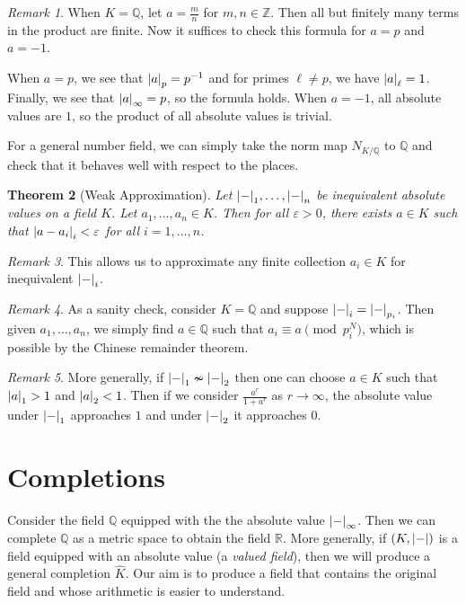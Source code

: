 \documentclass[leqno, openany]{memoir}
\newtheorem{thm}{Theorem}[section]
\theoremstyle{definition}
\theoremstyle{remark}
\newtheorem{rmk}[thm]{Remark}
\theoremstyle{plain}
\theoremstyle{definition}
\theoremstyle{remark}
\newcommand{\R}{\mathbb{R}}
\newcommand{\Z}{\mathbb{Z}}
\newcommand{\Q}{\mathbb{Q}}
\newcommand{\ep}{\varepsilon}
\newcommand{\wh}[1]{\widehat{#1}}
\begin{document}
\begin{rmk}
    When $K = \Q$, let $a = \frac{m}{n}$ for $m,n \in \Z$. Then all but finitely many terms in the product are finite. Now it suffices to check this formula for $a = p$ and $a = -1$.

    When $a = p$, we see that $\abs{a}_p = p^{-1}$ and for primes $\ell \neq p$, we have $\abs{a}_{\ell} = 1$. Finally, we see that $\abs{a}_{\infty} = p$, so the formula holds. When $a = -1$, all absolute values are $1$, so the product of all absolute values is trivial.

    For a general number field, we can simply take the norm map $N_{K/\Q}$ to $\Q$ and check that it behaves well with respect to the places.
\end{rmk}

\begin{thm}[Weak Approximation]
    Let $\abs{-}_1, \ldots, \abs{-}_n$ be inequivalent absolute values on a field $K$. Let $a_1, \ldots, a_n \in K$. Then for all $\ep > 0$, there exists $a \in K$ such that $\abs{a-a_i}_i < \ep$ for all $i = 1, \ldots, n$.
\end{thm}

\begin{rmk}
    This allows us to approximate any finite collection $a_i \in K$ for inequivalent $\abs{-}_i$.
\end{rmk}

\begin{rmk}
    As a sanity check, consider $K = \Q$ and suppose $\abs{-}_i = \abs{-}_{p_i}$. Then given $a_1, \ldots, a_n$, we simply find $a \in \Q$ such that $a_i \equiv a \pmod p_i^N$, which is possible by the Chinese remainder theorem.
\end{rmk}

\begin{rmk}
    More generally, if $\abs{-}_1 \nsim \abs{-}_2$ then one can choose $a \in K$ such that $\abs{a}_1 > 1$ and $\abs{a}_2 < 1$. Then if we consider $\frac{a^r}{1+a^r}$ as $r \to \infty$, the absolute value under $\abs{-}_1$ approaches $1$ and under $\abs{-}_2$ it approaches $0$.
\end{rmk}

\section{Completions}%
\label{sec:completions}

Consider the field $\Q$ equipped with the the absolute value $\abs{-}_{\infty}$. Then we can complete $\Q$ as a metric space to obtain the field $\R$. More generally, if $(K, \abs{-})$ is a field equipped with an absolute value (a \textit{valued field}), then we will produce a general completion $\wh{K}$. Our aim is to produce a field that contains the original field and whose arithmetic is easier to understand.
\end{document}
